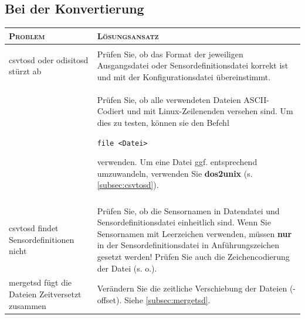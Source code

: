 \documentclass[10pt,a5paper,twoside,titlepage]{scrartcl}
\begin{document}
\subsection{Bei der Konvertierung}
\begin{tabular}{p{}|p{6.3cm}}
\textsc{Problem} & \textsc{Lösungsansatz}\\
\hline
\vspace{1em}&\vspace{1em}\\
csvtosd oder odisitosd stürzt ab & Prüfen Sie, ob das Format der jeweiligen Ausgangsdatei oder Sensordefinitionsdatei korrekt ist und mit der Konfigurationsdatei übereinstimmt.\\
& Prüfen Sie, ob alle verwendeten Dateien ASCII-Codiert und mit Linux-Zeilenenden versehen sind. Um dies zu testen, können sie den Befehl

\texttt{file <Datei>}

verwenden. Um eine Datei ggf. entsprechend umzuwandeln, verwenden Sie \textbf{dos2unix} (s. \ref{subsec:csvtosd}).\\
\vspace{1em}&\vspace{1em}\\
csvtosd findet Sensordefinitionen nicht & Prüfen Sie, ob die Sensornamen in Datendatei und Sensordefinitionsdatei einheitlich sind. Wenn Sie Sensornamen mit Leerzeichen verwenden, müssen \textbf{nur} in der Sensordefinitionsdatei in Anführungszeichen gesetzt werden! Prüfen Sie auch die Zeichencodierung der Datei (s. o.).\vspace{1em}\\

mergetsd fügt die Dateien Zeitversetzt zusammen & Verändern Sie die zeitliche Verschiebung der Dateien (-offset). Siehe \ref{subsec:mergetsd}.\\
\end{tabular}
\end{document}
